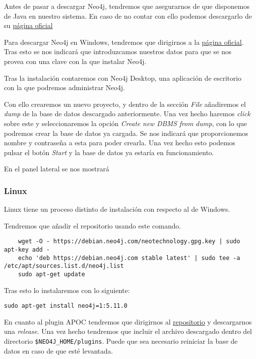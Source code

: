 Antes de pasar a descargar Neo4j, tendremos que asegurarnos de que disponemos de Java en nuestro sistema. En caso de no contar con ello podemos descargarlo de su 
\href{https://www.java.com/es/download/}{página oficial}

Para descargar Neo4j en Windows, tendremos que dirigirnos a la \href{https://neo4j.com/download/}{página oficial}. Tras esto se nos indicará que introduzcamos nuestros datos para que se nos provea con una clave con la que instalar Neo4j.


Tras la instalación contaremos con Neo4j Desktop, una aplicación de escritorio con la que podremos administrar Neo4j. 

Con ello crearemos un nuevo proyecto, y dentro de la sección \textit{File} añadiremos el \textit{dump} de la base de datos descargado anteriormente. Una vez hecho haremos \textit{click} sobre este y seleccionaremos la opción \textit{Create new DBMS from dump}, con lo que podremos crear la base de datos ya cargada. Se nos indicará que proporcionemos nombre y contraseña a esta para poder crearla. Una vez hecho esto podemos pulsar el botón \textit{Start} y la base de datos ya estaría en funcionamiento.

En el panel lateral se nos mostrará 

\subsubsection{Linux}

Linux tiene un proceso distinto de instalación con respecto al de Windows.


Tendremos que añadir el repositorio usando este comando.
\begin{verbatim}
	wget -O - https://debian.neo4j.com/neotechnology.gpg.key | sudo apt-key add -
	echo 'deb https://debian.neo4j.com stable latest' | sudo tee -a /etc/apt/sources.list.d/neo4j.list
	sudo apt-get update
\end{verbatim}

Tras esto lo instalaremos con lo siguiente:

\begin{verbatim}
sudo apt-get install neo4j=1:5.11.0
\end{verbatim}

En cuanto al plugin APOC tendremos que dirigirnos al \href{https://github.com/neo4j-contrib/neo4j-apoc-procedures/releases/4.4.0.21}{repositorio} y descargarnos una \textit{release}. Una vez hecho tendremos que incluir el archivo descargado dentro del directorio \texttt{\$NEO4J\_HOME/plugins}. Puede que sea necesario reiniciar la base de datos en caso de que esté levantada.

